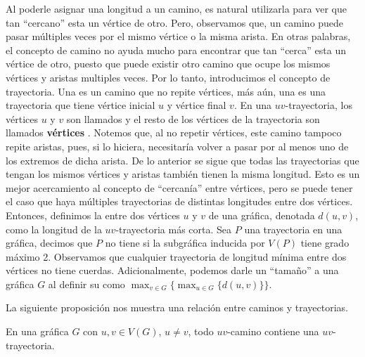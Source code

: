 Al poderle asignar una longitud a un camino, es natural utilizarla para ver
que tan ``cercano'' esta un v\'ertice de otro. Pero, observamos que, un
camino puede pasar m\'ultiples veces por el mismo v\'ertice o la misma
arista. En otras palabras, el concepto de camino no ayuda mucho para
encontrar que tan ``cerca'' esta un v\'ertice de otro, puesto que puede
existir otro camino que ocupe los mismos v\'ertices y aristas multiples
veces. Por lo tanto, introducimos el concepto de trayectoria. Una
 es un camino que no repite v\'ertices, m\'as a\'un, una
 es una trayectoria que tiene v\'ertice inicial $u$
y v\'ertice final $v$. En una $uv$-trayectoria, los v\'ertices $u$ y $v$ son
llamados  y el resto de los v\'ertices de la
trayectoria son llamados \textbf{v\'ertices}
. Notemos que, al no repetir v\'ertices,
este camino tampoco repite aristas, pues, si lo hiciera, necesitar\'ia
volver a pasar por al menos uno de los extremos de dicha arista. De lo
anterior se sigue que todas las trayectorias que tengan los mismos
v\'ertices y aristas tambi\'en tienen la misma longitud. Esto es un mejor
acercamiento al concepto de ``cercan\'ia'' entre v\'ertices, pero se puede
tener el caso que haya m\'ultiples trayectorias de distintas longitudes
entre dos v\'ertices. Entonces, definimos la  entre dos
v\'ertices $u$ y $v$ de una gr\'afica, denotada $d(u,v)$, como la longitud
de la $uv$-trayectoria m\'as corta. Sea $P$ una trayectoria en una
gr\'afica, decimos que $P$ no tiene  si la subgr\'afica
inducida por $V(P)$ tiene grado m\'aximo 2. Observamos que cualquier
trayectoria de longitud m\'inima entre dos v\'ertices no tiene cuerdas.
Adicionalmente, podemos darle un ``tama\~{n}o'' a una gr\'afica $G$ al
definir su  como $\max_{v\in G}\{\max_{u\in
G}\{d(u,v)\}\}$. 

La siguiente proposici\'on nos muestra una relaci\'on entre caminos y
trayectorias.  

\begin{proposicion}
\label{prop:CamTray}
    En una gr\'afica $G$ con $u, v \in V(G)$, $u \ne v$, todo $uv$-camino
    contiene una $uv$-trayectoria.
\end{proposicion}

